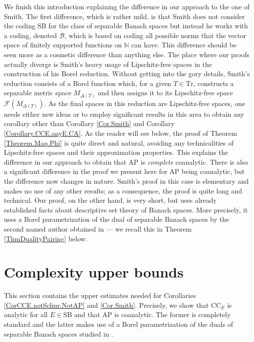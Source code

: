 \documentclass[letterpaper]{amsart}
\numberwithin{equation}{section}
\theoremstyle{definition}
\newcommand{\N}{{\mathbb{N}}}
\newcommand{\Tr}{\mathrm{Tr}}
\newcommand{\SB}{\mathrm{SB}}
\newcommand{\AP}{\mathrm{AP}}
\begin{document}
We finish this introduction explaining the difference in our approach to the one of  Smith. The first difference, which is rather mild, is that Smith does not consider the coding $\SB$ for the class of separable Banach spaces but instead he works with a coding, denoted $\mathcal B$, which is based on coding all possible norms that the vector space of finitely supported functions on $\N$ can have. This difference should be seen more as a cosmetic difference than anything else. The place where our proofs actually diverge is Smith's heavy usage of Lipschitz-free spaces in the construction of his Borel reduction. Without getting into the gory details, Smith's reduction consists of a Borel function which, for a given $T\in \Tr$, constructs a separable metric space $M_{\Delta(T)}$ and then assigns it to its Lipschitz-free space $\mathcal F(M_{\Delta(T)})$. As the final spaces in this reduction are Lipschitz-free spaces, one needs either new ideas or to employ significant results in this area to obtain any corollary other than Corollary \ref{Cor.Smith} and Corollary \ref{Corollary.CCE.anyE.CA}. As the reader will see below, the proof of Theorem \ref{Theorem.Map.Phi} is quite direct and natural, avoiding any technicalities of Lipschitz-free spaces and their approximation properties. This explains the difference in our approach to obtain that $\AP$ is \emph{complete} coanalytic. There is also a significant difference in the proof we present here for $\AP$ being coanalytic, but the difference now changes in nature. Smith's proof in this case is elementary and makes no use of any other results; as a consequence, the proof is quite long and technical. Our proof, on the other hand, is very short, but uses already established facts about descriptive set theory of Banach spaces. More precisely, it uses a Borel parametrization of the dual of separable Banach spaces by the second named author obtained in  \cite[Theorem 1.3]{Braga2015AIFourier} --- we recall this in   Theorem \ref{ThmDualityPairing} below.
 

 
 

\section{Complexity upper bounds}

This section contains the  upper estimates needed for Corollaries \ref{CorCCE.notSchur.NotAP} and \ref{Cor.Smith}. Precisely, we show that $\mathrm{CC}_E$ is analytic for all $E\in \SB$ and that $\AP$ is coanalytic. The former is completely standard and  the latter  makes use of a Borel parametrization of the duals of separable Banach spaces studied in \cite{Braga2015AIFourier}.
\end{document}

